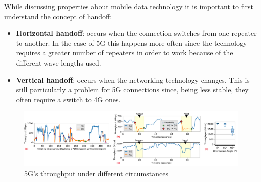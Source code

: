 While discussing properties about mobile data technology it is important to first understand the concept of handoff:
\begin{itemize}
    \item \textbf{Horizontal handoff}: occurs when the connection switches from one repeater to another. In the case of 5G this happens more often since the technology requires a greater number of repeaters in order to work because of the different wave lengths used.
    \item \textbf{Vertical handoff}: occurs when the networking technology changes. This is still particularly a problem for 5G connections since, being less stable, they often require a switch to 4G ones.  
\end{itemize}
\begin{figure}[H]
    \centering
    \includegraphics[width=\linewidth]{document/chapters/chapter_3/images/5G_performances.png}
    \caption{5G's throughput under different circumstances \cite{5g_performances}}
    \label{fig:5G_performances_graphs}
\end{figure}

